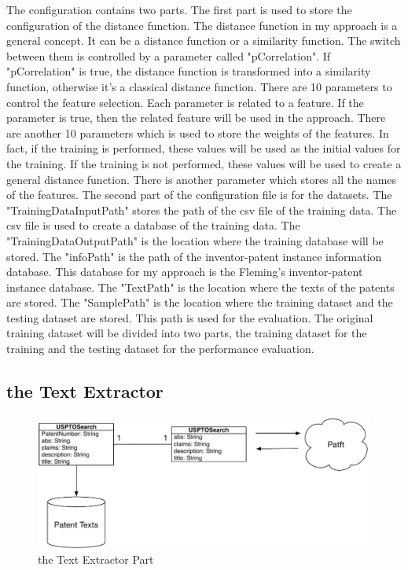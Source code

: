 The configuration contains two parts. The first part is used to store the configuration of the distance function. The distance function in my approach is a general concept. It can be a distance function or a similarity function. The switch between them is controlled by a parameter called "pCorrelation". If "pCorrelation" is true, the distance function is transformed into a similarity function, otherwise it's a classical distance function. There are 10 parameters to control the feature selection. Each parameter is related to a feature. If the parameter is true, then the related feature will be used in the approach. There are another 10 parameters which is used to store the weights of the features. In fact, if the training is performed, these values will be used as the initial values for the training. If the training is not performed, these values will be used to create a general distance function.  There is another parameter which stores all the names of the features. The second part of the configuration file is for the datasets. The "TrainingDataInputPath" stores the path of the csv file of the training data. The csv file is used to create a database of the training data. The "TrainingDataOutputPath" is the location where the training database will be stored. The "infoPath" is the path of the inventor-patent instance information database. This database for my approach is the Fleming's inventor-patent instance database. The "TextPath" is the location where the texts of the patents are stored. The "SamplePath" is the location where the training dataset and the testing dataset are stored. This path is used for the evaluation. The original training dataset will be divided into two parts, the training dataset for the training and the testing dataset for the performance evaluation. 

 

\subsection{the Text Extractor}
\begin{figure}
\centering
\includegraphics[scale=0.65]{TextExtractor.pdf}
\caption{the Text Extractor Part}
\end{figure}

